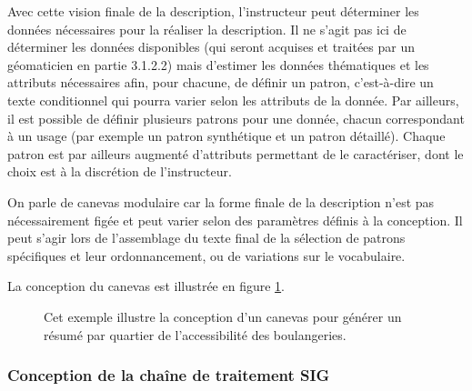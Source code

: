 \newpar{}

Avec cette vision finale de la description, l’instructeur peut déterminer les données nécessaires pour la réaliser la description. Il ne s’agit pas ici de déterminer les données disponibles (qui seront acquises et traitées par un géomaticien en partie 3.1.2.2) mais d’estimer les données thématiques et les attributs nécessaires afin, pour chacune, de définir un patron, c’est-à-dire un texte conditionnel qui pourra varier selon les attributs de la donnée. Par ailleurs, il est possible de définir plusieurs patrons pour une donnée, chacun correspondant à un usage (par exemple un patron synthétique et un patron détaillé). Chaque patron est par ailleurs augmenté d’attributs permettant de le caractériser, dont le choix est à la discrétion de l’instructeur.

\newpar{}

On parle de canevas modulaire car la forme finale de la description n’est pas nécessairement figée et peut varier selon des paramètres définis à la conception. Il peut s’agir lors de l’assemblage du texte final de la sélection de patrons spécifiques et leur ordonnancement, ou de variations sur le vocabulaire.

\newpar{}

La conception du canevas est illustrée en figure \ref{fig:desc_canevas_modulaire}.

\begin{figure}
    \centering
    \caption[Exemple de canevas de description]{Cet exemple illustre la conception d'un canevas pour générer un résumé par quartier de l'accessibilité des boulangeries.}
    \label{fig:desc_canevas_modulaire}
\end{figure}

\subsubsection{Conception de la chaîne de traitement SIG}

